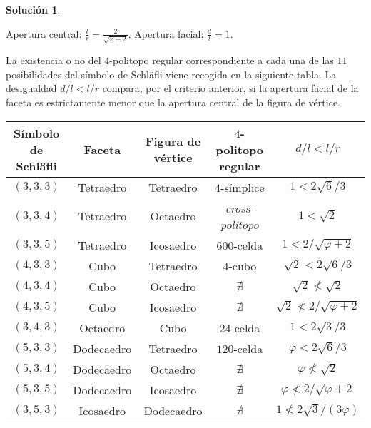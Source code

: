 \documentclass[10pt]{article}
\theoremstyle{definition}
\newtheorem*{sol}{Solución}
\begin{document}
\begin{sol}
\begin{enumerate}[(a)]
\begin{itemize}
    Apertura central: $\frac{l}{r}=\frac{2}{\sqrt{\varphi+2}}$.
    Apertura facial: $\frac{d}{l}=1$.
\end{itemize}
La existencia o no del $4$-politopo regular correspondiente a cada una de las $11$ posibilidades del símbolo de Schläfli viene recogida en la siguiente tabla. La desigualdad $d/l<l/r$ compara, por el criterio anterior, si la apertura facial de la faceta es estrictamente menor que la apertura central de la figura de vértice.
\begin{center}
\begin{tabular}{|c|c|c|c|c|}
\hline Símbolo de Schläfli    & Faceta     & Figura de vértice & $4$-politopo regular  & $d/l < l/r$ \\
\hline $(3,3,3)$              & Tetraedro  & Tetraedro         & $4$-símplice          & $1<2\sqrt{6}/3$\\
\hline $(3,3,4)$              & Tetraedro  & Octaedro          & \textit{cross-politopo} & $1<\sqrt{2}$\\
\hline $(3,3,5)$              & Tetraedro  & Icosaedro         & $600$-celda           & $1<2/\sqrt{\varphi+2}$\\
\hline $(4,3,3)$              & Cubo       & Tetraedro         & $4$-cubo              & $\sqrt{2}<2\sqrt{6}/3$\\
\hline $(4,3,4)$              & Cubo       & Octaedro          & $\nexists$            & $\sqrt{2}\not<\sqrt{2}$\\
\hline $(4,3,5)$              & Cubo       & Icosaedro         & $\nexists$            & $\sqrt{2}\not< 2/\sqrt{\varphi+2}$\\
\hline $(3,4,3)$              & Octaedro   & Cubo              & $24$-celda            & $1<2\sqrt{3}/3$\\
\hline $(5,3,3)$              & Dodecaedro & Tetraedro         & $120$-celda           & $\varphi<2\sqrt{6}/3$\\
\hline $(5,3,4)$              & Dodecaedro & Octaedro          & $\nexists$            & $\varphi\not<\sqrt{2}$\\
\hline $(5,3,5)$              & Dodecaedro & Icosaedro         & $\nexists$            & $\varphi\not< 2/\sqrt{\varphi+2}$\\
\hline $(3,5,3)$              & Icosaedro  & Dodecaedro        & $\nexists$            & $1\not < 2\sqrt{3}/(3\varphi)$\\ \hline
\end{tabular}\end{center}
\end{enumerate}
\end{sol}
\end{document}
